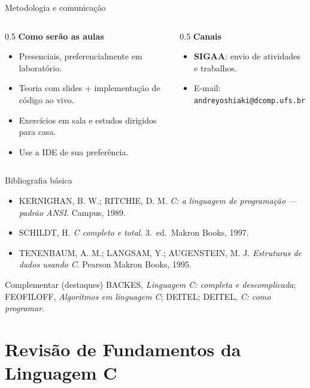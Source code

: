 \documentclass[aspectratio=169]{beamer}
\begin{document}
\begin{frame}{Metodologia e comunicação}
  \begin{columns}[T]
    \begin{column}{0.5\textwidth}
      \textbf{Como serão as aulas}
      \begin{itemize}
        \item Presenciais, preferencialmente em laboratório.
        \item Teoria com slides + implementação de código ao vivo.
        \item Exercícios em sala e estudos dirigidos para casa.
        \item Use a IDE de sua preferência.
      \end{itemize}
    \end{column}
    \begin{column}{0.5\textwidth}
      \textbf{Canais}
      \begin{itemize}
        \item \textbf{SIGAA}: envio de atividades e trabalhos.
        \item E-mail: \texttt{andreyoshiaki@dcomp.ufs.br}
      \end{itemize}
    \end{column}
  \end{columns}
\end{frame}

\begin{frame}{Bibliografia básica}
  \begin{itemize}
    \item KERNIGHAN, B. W.; RITCHIE, D. M. \textit{C: a linguagem de programação
      --- padrão ANSI}. Campus, 1989.
    \item SCHILDT, H. \textit{C completo e total}. 3.\ ed.\ Makron Books, 1997.
    \item TENENBAUM, A. M.; LANGSAM, Y.; AUGENSTEIN, M. J. \textit{Estruturas de
      dados usando C}. Pearson Makron Books, 1995.
  \end{itemize}
  \begin{exampleblock}{Complementar (destaques)}
    BACKES, \textit{Linguagem C: completa e descomplicada};
    FEOFILOFF, \textit{Algoritmos em linguagem C};
    DEITEL; DEITEL, \textit{C: como programar}.
  \end{exampleblock}
\end{frame}

\section{Revisão de Fundamentos da Linguagem C}
\end{document}
